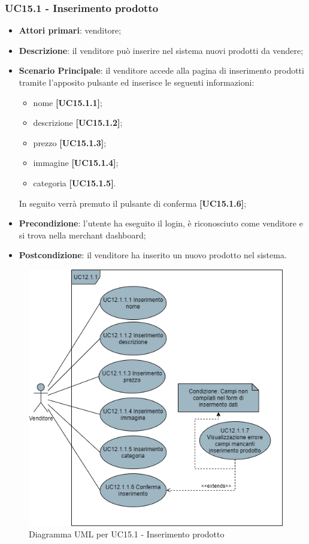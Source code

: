 \subsubsection{UC15.1 - Inserimento prodotto}
\begin{itemize}
\item \textbf{Attori primari}: venditore;
\item \textbf{Descrizione}: il venditore può inserire nel sistema nuovi prodotti da vendere;
\item \textbf{Scenario Principale}: il venditore accede alla pagina di inserimento prodotti tramite l'apposito pulsante ed inserisce le seguenti informazioni:
\begin{itemize}
	\item nome \textbf{[UC15.1.1]};
	\item descrizione \textbf{[UC15.1.2]};
	\item prezzo \textbf{[UC15.1.3]};
	\item immagine \textbf{[UC15.1.4]};
	\item categoria \textbf{[UC15.1.5]}.
\end{itemize}
In seguito verrà premuto il pulsante di conferma \textbf{[UC15.1.6]};
\item \textbf{Precondizione}: l'utente ha eseguito il login, è riconosciuto come venditore e si trova nella merchant dashboard;
\item \textbf{Postcondizione}: il venditore ha inserito un nuovo prodotto nel sistema.
\end{itemize}

\begin{figure}[H]
\centering
\includegraphics[scale=0.6]{res/UseCase/Immagini/InserimentoProdotto}
\caption{Diagramma UML per UC15.1 - Inserimento prodotto}
\end{figure}

